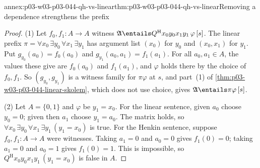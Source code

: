 \begin{annexitem}{annex:p03-w03-p03-044-qh-vs-linear}{thm:p03-w03-p03-044-qh-vs-linear}{Removing a dependence strengthens the prefix}
\begin{proof}
(1) Let \(f_0,f_1:A\to A\) witness
\(\mathfrak A\entails Q^{\mathrm H}x_0y_0x_1y_1\,\varphi\,[s]\).  The
linear prefix \(\pi=\forall x_0\,\exists y_0\,\forall x_1\,\exists y_1\) has
argument list \((x_0)\) for \(y_0\) and \((x_0,x_1)\) for \(y_1\).  Put
\(g_{y_0}(a_0)=f_0(a_0)\) and \(g_{y_1}(a_0,a_1)=f_1(a_1)\).  For all
\(a_0,a_1\in A\), the values these give are \(f_0(a_0)\) and \(f_1(a_1)\),
and \(\varphi\) holds there by the choice of \(f_0,f_1\).  So
\((g_{y_0},g_{y_1})\) is a witness family for \(\pi\varphi\) at \(s\), and
part~(1) of \cref{thm:p03-w03-p03-044-linear-skolem}, which does not use
choice, gives \(\mathfrak A\entails\pi\varphi\,[s]\).

(2) Let \(A=\{0,1\}\) and \(\varphi\) be \(y_1=x_0\).  For the linear
sentence, given \(a_0\) choose \(y_0=0\); given then \(a_1\) choose
\(y_1=a_0\).  The matrix holds, so
\(\forall x_0\,\exists y_0\,\forall x_1\,\exists y_1\,(y_1=x_0)\) is true.
For the Henkin sentence, suppose \(f_0,f_1:A\to A\) were witnesses.  Taking
\(a_1=0\) and \(a_0=0\) gives \(f_1(0)=0\); taking \(a_1=0\) and \(a_0=1\)
gives \(f_1(0)=1\).  This is impossible, so
\(Q^{\mathrm H}x_0y_0x_1y_1\,(y_1=x_0)\) is false in \(A\).
\end{proof}
\end{annexitem}

